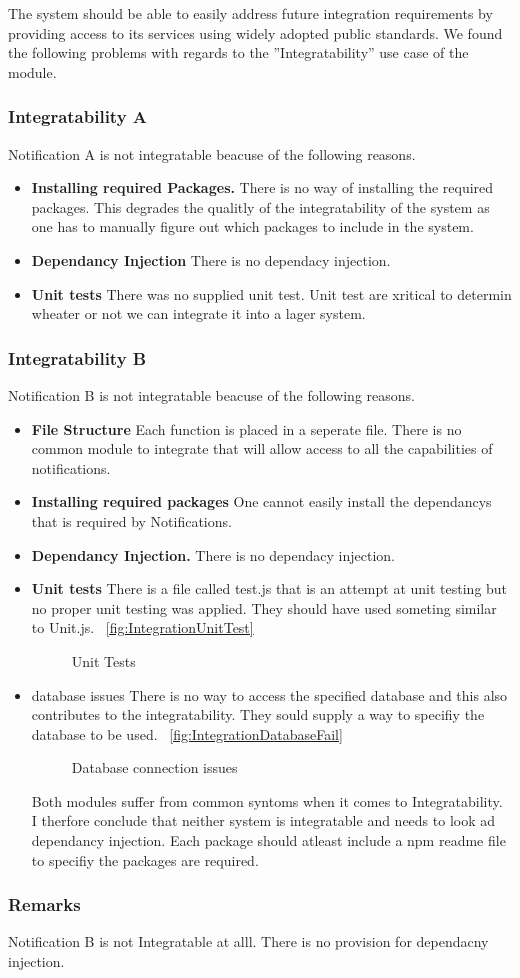 The system should be able to easily address future integration requirements by providing access to its services using widely adopted public standards.
We found the following problems with regards to the ''Integratability'' use case of the module.
\subsubsection*{Integratability A}
Notification A is not integratable beacuse of the following reasons.
\begin{itemize}
	\item \textbf{Installing required Packages.}
	There is no way of installing the required packages. This degrades the qualitly of the integratability of the system as one has to manually figure out which packages to include in the system.
	\item \textbf{Dependancy Injection}
	There is no dependacy injection.
	\item \textbf{Unit tests}
	There was no supplied unit test. Unit test are xritical to determin wheater or not we can integrate it into a lager system.
\end{itemize}
\subsubsection*{Integratability B}
Notification B is not integratable beacuse of the following reasons.
\begin{itemize}
	\item \textbf{File Structure} 
	Each function is placed in a seperate file. There is no common module to integrate that will allow access to all the capabilities of notifications.
	\item \textbf{Installing required packages}
	One cannot easily install the dependancys that is required by Notifications.
	\item \textbf{Dependancy Injection.}
	There is no dependacy injection.
	\item \textbf{Unit tests} There is a file called test.js that is an attempt at unit testing but no proper unit testing was applied. They should have used someting similar to Unit.js.
		~\ref{fig:IntegrationUnitTest}
		\begin{figure}[H]
			\centering
			\caption{Unit Tests}
			\label{fig:scope}
		\end{figure}
	\item database issues
	There is no way to access the specified database and this also contributes to the integratability. They sould supply a way to specifiy the database to be used.
		~\ref{fig:IntegrationDatabaseFail}
		\begin{figure}[H]
			\centering
			\caption{Database connection issues}
			\label{fig:scope}
		\end{figure}
Both modules suffer from common syntoms when it comes to Integratability. I therfore conclude that neither system is integratable and needs to look ad dependancy injection. Each package should atleast include a npm readme file to specifiy the packages are required.
\end{itemize}
\subsubsection*{Remarks}
Notification B is not Integratable at alll. There is no provision for dependacny injection.